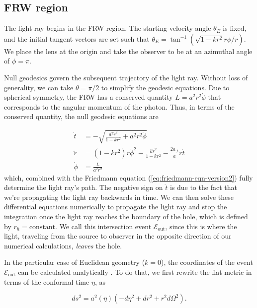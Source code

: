 \subsection{FRW region}

The light ray begins in the FRW region. The starting velocity angle $\theta_E$ is fixed, and the initial tangent vectors are set such that $\theta_E = \tan^{-1}(\sqrt{1-kr^2}r\dot{\phi}/\dot{r})$. We place the lens at the origin and take the observer to be at an azimuthal angle of $\phi = \pi$. 

Null geodesics govern the subsequent trajectory of the light ray. Without loss of generality, we can take $\theta = \pi/2$ to simplify the geodesic equations. Due to spherical symmetry, the FRW has a conserved quantity $L = a^2 r^2 \dot{\phi}$ that corresponds to the angular momentum of the photon. Thus, in terms of the conserved quantity, the null geodesic equations are

\begin{subequations}
  \begin{align}
    \dot{t} &= -\sqrt{\frac{a^2\dot{r}^2}{1-kr^2} + a^2r^2 \dot{\phi}}\\
    \ddot{r}  &= (1-kr^2)r\dot{\phi}^2 - \frac{k\dot{r}^2}{1-kr^2} - \frac{2a_{,t}}{a}\dot{r}\dot{t}\\
    \dot{\phi} &= \frac{L}{a^2 r^2}
  \end{align}
  \label{eq:frw-null-geodesics}
\end{subequations}
which, combined with the Friedmann equation (\autoref{eq:friedmann-eqn-version2}) fully determine the light ray's path. The negative sign on $\dot{t}$ is due to the fact that we're propagating the light ray backwards in time. We can then solve these differential equations numerically to propagate the light ray and stop the integration once the light ray reaches the boundary of the hole, which is defined by $r_h = \text{constant}$. We call this intersection event $\mathcal{E}_{\text{out}}$, since this is where the light, traveling from the source to observer in the opposite direction of our numerical calculations, \emph{leaves} the hole. 

In the particular case of Euclidean geometry ($k = 0$), the coordinates of the event $\mathcal{E}_{\text{out}}$ can be calculated analytically \citep{fleury2013interpretation}. To do that, we first rewrite the flat metric in terms of the conformal time $\eta$, as

\begin{equation}
  ds^2 = a^2(\eta) \left ( -d \eta^2 + dr^2 + r^2 d \Omega^2 \right ).
  \label{eq:frw-metric-conformal-time}
\end{equation}

